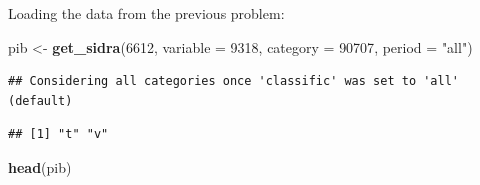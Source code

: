 \documentclass[
]{article}
\newenvironment{Shaded}{\begin{snugshade}}{\end{snugshade}}
\newcommand{\DataTypeTok}[1]{\textcolor[rgb]{0.13,0.29,0.53}{#1}}
\newcommand{\DecValTok}[1]{\textcolor[rgb]{0.00,0.00,0.81}{#1}}
\newcommand{\KeywordTok}[1]{\textcolor[rgb]{0.13,0.29,0.53}{\textbf{#1}}}
\newcommand{\NormalTok}[1]{#1}
\newcommand{\OperatorTok}[1]{\textcolor[rgb]{0.81,0.36,0.00}{\textbf{#1}}}
\newcommand{\StringTok}[1]{\textcolor[rgb]{0.31,0.60,0.02}{#1}}
\begin{document}
Loading the data from the previous problem:

\begin{Shaded}
\begin{Highlighting}[]
\NormalTok{pib <-}\StringTok{ }\KeywordTok{get_sidra}\NormalTok{(}\DecValTok{6612}\NormalTok{, }\DataTypeTok{variable =} \DecValTok{9318}\NormalTok{, }\DataTypeTok{category =} \DecValTok{90707}\NormalTok{, }\DataTypeTok{period =} \StringTok{"all"}\NormalTok{)}
\end{Highlighting}
\end{Shaded}

\begin{verbatim}
## Considering all categories once 'classific' was set to 'all' (default)
\end{verbatim}

\begin{Shaded}
\end{Shaded}

\begin{verbatim}
## [1] "t" "v"
\end{verbatim}

\begin{Shaded}
\begin{Highlighting}[]
\KeywordTok{head}\NormalTok{(pib)}
\end{Highlighting}
\end{Shaded}
\end{document}
